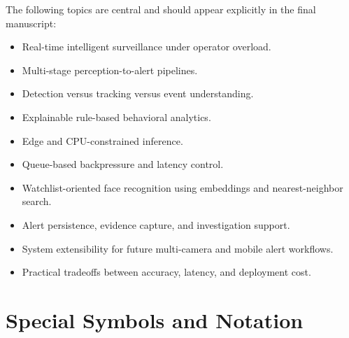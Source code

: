 \documentclass[11pt]{article}
\begin{document}
The following topics are central and should appear explicitly in the final manuscript:

\begin{itemize}
\item Real-time intelligent surveillance under operator overload.
\item Multi-stage perception-to-alert pipelines.
\item Detection versus tracking versus event understanding.
\item Explainable rule-based behavioral analytics.
\item Edge and CPU-constrained inference.
\item Queue-based backpressure and latency control.
\item Watchlist-oriented face recognition using embeddings and nearest-neighbor search.
\item Alert persistence, evidence capture, and investigation support.
\item System extensibility for future multi-camera and mobile alert workflows.
\item Practical tradeoffs between accuracy, latency, and deployment cost.
\end{itemize}

\section{Special Symbols and Notation}
\end{document}
